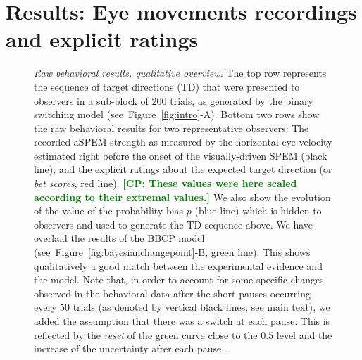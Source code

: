 \documentclass[12pt,english]{article}%
\newcommand{\seeFig}[1]{Figure~\ref{fig:#1}}
\newcommand{\CP}[1]{\textbf{\textcolor{green}{[CP: #1]}}}
\begin{document}
\section{Results: Eye movements recordings and explicit ratings}
\label{sec:results_psycho}
\begin{figure}%
\caption{
\emph{Raw behavioral results, qualitative overview.} %
The top row represents the sequence of target directions (TD)
that were presented to observers
in a sub-block of $200$ trials,
as generated by the binary switching model (see~\seeFig{intro}-A).
Bottom two rows show the raw behavioral results
for two representative observers:
The recorded aSPEM strength as measured
by the horizontal eye velocity estimated right before
the onset of the visually-driven SPEM (black line);
and the explicit ratings about the expected target direction (or \textit{bet scores}, red line).
\CP{These values were here scaled according to their extremal values.}
We also show the evolution of the value
of the probability bias $p$ (blue line)
which is hidden to observers
and used to generate the TD sequence above.
We have overlaid the results of the BBCP model
(see~\seeFig{bayesianchangepoint}-B, green line).
This shows qualitatively a good match between
the experimental evidence and the model.
Note that, in order to account for some specific changes 
observed in the behavioral data after the short pauses 
occurring every $50$ trials (as denoted by vertical black lines, see main text), 
we added the assumption %
that there was a switch at each pause. 
This is reflected by the \textit{reset} of the green curve close to the $0.5$ level and 
the increase of the uncertainty after each pause . %
}
\label{fig:results_psycho}
\end{figure}
\end{document}
